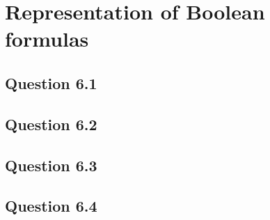 \documentclass[10pt,a4paper]{article}
\begin{document}
\section{Representation of Boolean formulas}
\subsection*{Question 6.1}
\subsection*{Question 6.2}
\subsection*{Question 6.3}
\subsection*{Question 6.4}
\end{document}
